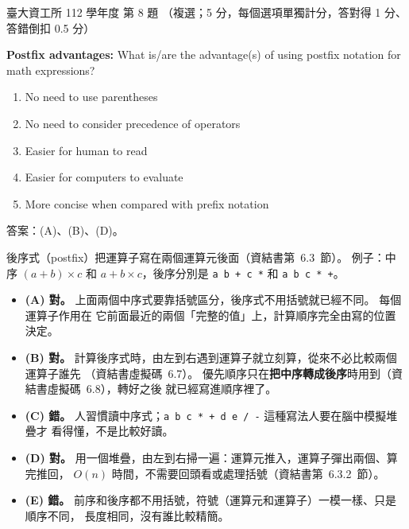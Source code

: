 \begin{pastexam}[label={px:ntu-112-dsa-08}]{臺大資工所 112 學年度 第 8 題}
（複選；5 分，每個選項單獨計分，答對得 1 分、答錯倒扣 0.5 分）

\textbf{Postfix advantages:} What is/are the advantage(s) of using postfix notation for math
expressions?
\begin{enumerate}[label=(\Alph*)]
\item No need to use parentheses
\item No need to consider precedence of operators
\item Easier for human to read
\item Easier for computers to evaluate
\item More concise when compared with prefix notation
\end{enumerate}
\end{pastexam}

\begin{pastsoln}
答案：(A)、(B)、(D)。

後序式（postfix）把運算子寫在兩個運算元後面（資結書第~6.3~節）。 例子：中序
$(a + b) \times c$ 和 $a + b \times c$，後序分別是 \texttt{a b + c *} 和 \texttt{a b c * +}。
\begin{itemize}
\item \textbf{(A) 對。} 上面兩個中序式要靠括號區分，後序式不用括號就已經不同。 每個運算子作用在
它前面最近的兩個「完整的值」上，計算順序完全由寫的位置決定。
\item \textbf{(B) 對。} 計算後序式時，由左到右遇到運算子就立刻算，從來不必比較兩個運算子誰先
（資結書虛擬碼~6.7）。 優先順序只在\textbf{把中序轉成後序}時用到（資結書虛擬碼~6.8），轉好之後
就已經寫進順序裡了。
\item \textbf{(C) 錯。} 人習慣讀中序式；\texttt{a b c * + d e / -} 這種寫法人要在腦中模擬堆疊才
看得懂，不是比較好讀。
\item \textbf{(D) 對。} 用一個堆疊，由左到右掃一遍：運算元推入，運算子彈出兩個、算完推回，
$O(n)$ 時間，不需要回頭看或處理括號（資結書第~6.3.2~節）。
\item \textbf{(E) 錯。} 前序和後序都不用括號，符號（運算元和運算子）一模一樣、只是順序不同，
長度相同，沒有誰比較精簡。
\end{itemize}
\end{pastsoln}

